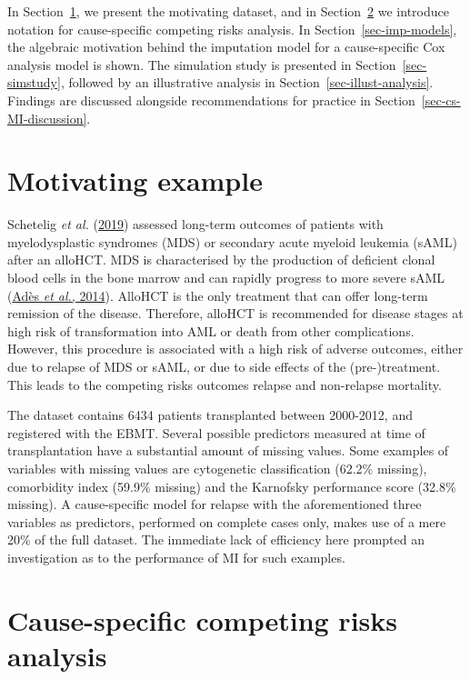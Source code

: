 \documentclass[
  letterpaper,
  DIV=11,
  numbers=noendperiod]{scrreprt}
\begin{document}
In Section~\ref{sec-motivating-example}, we present the motivating
dataset, and in Section~\ref{sec-comprisks} we introduce notation for
cause-specific competing risks analysis. In
Section~\ref{sec-imp-models}, the algebraic motivation behind the
imputation model for a cause-specific Cox analysis model is shown. The
simulation study is presented in Section~\ref{sec-simstudy}, followed by
an illustrative analysis in Section~\ref{sec-illust-analysis}. Findings
are discussed alongside recommendations for practice in
Section~\ref{sec-cs-MI-discussion}.

\hypertarget{sec-motivating-example}{%
\section{Motivating example}\label{sec-motivating-example}}

Schetelig \emph{et al.}
(\protect\hyperlink{ref-scheteligLateTreatmentrelatedMortality2019}{2019})
assessed long-term outcomes of patients with myelodysplastic syndromes
(MDS) or secondary acute myeloid leukemia (sAML) after an alloHCT. MDS
is characterised by the production of deficient clonal blood cells in
the bone marrow and can rapidly progress to more severe sAML
(\protect\hyperlink{ref-adesMyelodysplasticSyndromes2014}{Adès \emph{et
al.}, 2014}). AlloHCT is the only treatment that can offer long-term
remission of the disease. Therefore, alloHCT is recommended for disease
stages at high risk of transformation into AML or death from other
complications. However, this procedure is associated with a high risk of
adverse outcomes, either due to relapse of MDS or sAML, or due to side
effects of the (pre-)treatment. This leads to the competing risks
outcomes relapse and non-relapse mortality.

The dataset contains 6434 patients transplanted between 2000-2012, and
registered with the EBMT. Several possible predictors measured at time
of transplantation have a substantial amount of missing values. Some
examples of variables with missing values are cytogenetic classification
(62.2\% missing), comorbidity index (59.9\% missing) and the Karnofsky
performance score (32.8\% missing). A cause-specific model for relapse
with the aforementioned three variables as predictors, performed on
complete cases only, makes use of a mere 20\% of the full dataset. The
immediate lack of efficiency here prompted an investigation as to the
performance of MI for such examples.

\hypertarget{sec-comprisks}{%
\section{Cause-specific competing risks analysis}\label{sec-comprisks}}
\end{document}
